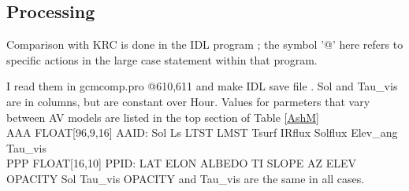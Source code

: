 \documentclass{article}
\begin{document}
\subsection{Processing}
Comparison with KRC is done in the IDL program ; the symbol '@' here refers to specific actions in the large case statement within that program.

I read them  in gcmcomp.pro @610,611 and make IDL save file . Sol and Tau_vis are in columns, but are constant over Hour. Values for parmeters that vary between AV models are listed in the top section of Table \ref{AshM}
\\ AAA FLOAT[96,9,16] AAID: Sol Ls LTST LMST Tsurf IRflux Solflux Elev_ang Tau_vis
\\ PPP FLOAT[16,10] PPID: LAT ELON ALBEDO TI SLOPE AZ ELEV OPACITY Sol Tau_vis
\qi  OPACITY and Tau_vis are the same in all cases.
\end{document}

